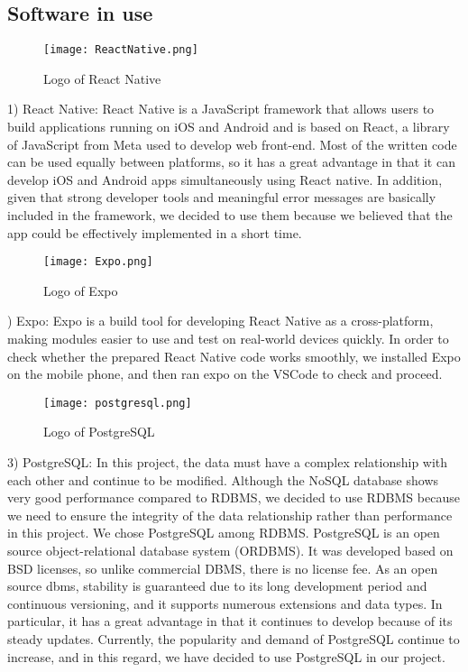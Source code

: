 \documentclass[conference]{IEEEtran}
\begin{document}
\subsection{Software in use}
\begin{figure}[htbp]
\centerline{\texttt{[image: ReactNative.png]}}
\label{fig}
\caption{Logo of React Native}
\end{figure}
1) React Native: React Native is a JavaScript framework that allows users to build applications running on iOS and Android and is based on React, a library of JavaScript from Meta used to develop web front-end. Most of the written code can be used equally between platforms, so it has a great advantage in that it can develop iOS and Android apps simultaneously using React native. In addition, given that strong developer tools and meaningful error messages are basically included in the framework, we decided to use them because we believed that the app could be effectively implemented in a short time.\\

\begin{figure}[htbp]
\centerline{\texttt{[image: Expo.png]}}
\label{fig}
\caption{Logo of Expo}
\end{figure}
) Expo: Expo is a build tool for developing React Native as a cross-platform, making modules easier to use and test on real-world devices quickly. In order to check whether the prepared React Native code works smoothly, we installed Expo on the mobile phone, and then ran expo on the VSCode to check and proceed.\\

\begin{figure}[htbp]
\centerline{\texttt{[image: postgresql.png]}}
\label{fig}
\caption{Logo of PostgreSQL}
\end{figure}
3) PostgreSQL: In this project, the data must have a complex relationship with each other and continue to be modified. Although the NoSQL database shows very good performance compared to RDBMS, we decided to use RDBMS because we need to ensure the integrity of the data relationship rather than performance in this project. We chose PostgreSQL among RDBMS.
PostgreSQL is an open source object-relational database system (ORDBMS). It was developed based on BSD licenses, so unlike commercial DBMS, there is no license fee. As an open source dbms, stability is guaranteed due to its long development period and continuous versioning, and it supports numerous extensions and data types. In particular, it has a great advantage in that it continues to develop because of its steady updates. Currently, the popularity and demand of PostgreSQL continue to increase, and in this regard, we have decided to use PostgreSQL in our project.\\
\end{document}
